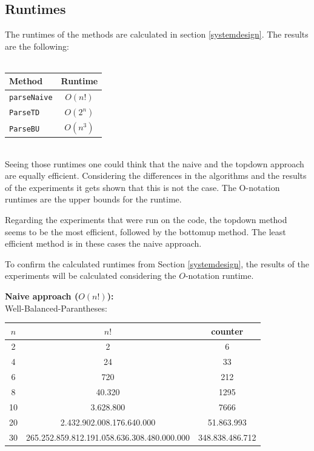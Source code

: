 \documentclass[a4paper, 11pt]{article}
\begin{document}
\subsection{Runtimes}
\label{runtime}


The runtimes of the methods are calculated in section \ref{systemdesign}. The results are the following:
\ \\ \\
\begin{tabular}{|l|c|}
\hline
Method & Runtime \\
\hline
\texttt{parseNaive} & $O(n!)$\\
\texttt{ParseTD} & $O(2^n)$ \\
\texttt{ParseBU} & $O(n^3)$\\
\hline
\end{tabular}

\ \\
Seeing those runtimes one could think that the naive and the topdown approach are equally efficient. Considering the differences in the algorithms and the results of the experiments it gets shown that this is not the case. The O-notation runtimes are the upper bounds for the runtime. 

Regarding the experiments that were run on the code, the topdown method seems to be the most efficient, followed by the bottomup method. The least efficient method is in these cases the naive approach.

To confirm the calculated runtimes from Section \ref{systemdesign}, the results of the experiments will be calculated considering the $O$-notation runtime.


\textbf{Naive approach ($O(n!)$):} \\
Well-Balanced-Parantheses: 

\begin{tabular}{|c|c|c|}
\hline
$n$ & $n!$ & counter \\
\hline
2& 2 & 6\\
4& 24 & 33\\
6& 720 & 212\\
8& 40.320 & 1295\\
10& 3.628.800 &7666 \\
20& 2.432.902.008.176.640.000 & 51.863.993\\
30& 265.252.859.812.191.058.636.308.480.000.000 & 348.838.486.712\\
\hline
\end{tabular}
\end{document}

